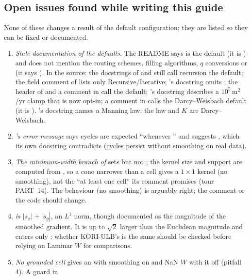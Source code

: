 \subsection{Open issues found while writing this guide}\label{pit:open}
None of these changes a result of the default configuration; they are listed so they can be fixed or documented.
\begin{enumerate}[leftmargin=1.5em]
\item \emph{Stale documentation of the defaults.} The README says  is the default  (it is
  ) and does not mention the routing schemes, filling algorithms, $q$ conversions or
   (it says ). In the source: the docstrings of  and
   still call recursion the default; the field comment of  lists only
  Recursive/Iterative; 's docstring omits ; the header of  and a comment in
   call  the default; 's docstring describes a $10^5$\,m$^2$/yr clamp that is now opt-in;
  a comment in  calls  the Darcy--Weisbach default (it is ).
  's docstring names a Manning law; the law and $K$ are Darcy--Weisbach.
\item \emph{'s error message} says cycles are expected ``whenever '' and suggests
  , which its own docstring contradicts (cycles persist without smoothing on real data).
\item \emph{The minimum-width branch of } sets  but not ; the kernel size and support are
  computed from , so a cone narrower than a cell gives a $1\times1$ kernel (no smoothing), not the ``at least one cell''
  its comment promises (tour PART~14). The behaviour (no smoothing) is arguably right; the comment or the code should change.
\item \emph{ is $|s_x| + |s_y|$}, an $L^1$ norm, though documented as the magnitude of the smoothed gradient. It
  is up to $\sqrt2$ larger than the Euclidean magnitude and enters only ; whether KORI-ULB's  is
  the same should be checked before relying on Laminar $W$ for comparisons.
\item \emph{No grounded cell} gives an  with smoothing on and NaN $W$ with it off (pitfall 4). A guard in

\end{enumerate}
